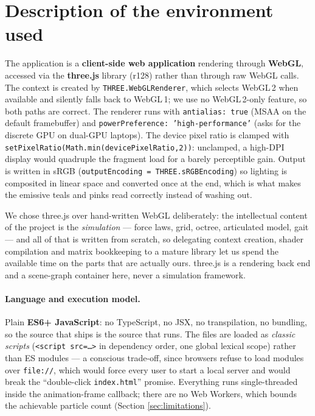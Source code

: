 \documentclass[10pt,a4paper]{article}
\newcommand{\code}[1]{\texttt{\small #1}}
\newcommand{\file}[1]{\texttt{\small\color{accent!70!black}#1}}
\begin{document}
\section{Description of the environment used}
\label{sec:environment}

The application is a \textbf{client-side web application} rendering through \textbf{WebGL}, accessed via
the \textbf{three.js} library (r128) rather than through raw WebGL calls. The context is created by
\code{THREE.WebGLRenderer}, which selects WebGL\,2 when available and silently falls back to WebGL\,1; we
use no WebGL\,2-only feature, so both paths are correct. The renderer runs with \code{antialias:\,true}
(MSAA on the default framebuffer) and \code{powerPreference:\,'high-performance'} (asks for the discrete
GPU on dual-GPU laptops). The device pixel ratio is clamped with
\code{setPixelRatio(Math.min(devicePixelRatio,2))}: unclamped, a high-DPI display would quadruple the
fragment load for a barely perceptible gain. Output is written in sRGB
(\code{outputEncoding = THREE.sRGBEncoding}) so lighting is composited in linear space and converted once
at the end, which is what makes the emissive teals and pinks read correctly instead of washing out.

We chose three.js over hand-written WebGL deliberately: the intellectual content of the project is the
\emph{simulation} --- force laws, grid, octree, articulated model, gait --- and all of that is written from
scratch, so delegating context creation, shader compilation and matrix bookkeeping to a mature library let
us spend the available time on the parts that are actually ours. three.js is a rendering back end and a
scene-graph container here, never a simulation framework.

\paragraph{Language and execution model.} Plain \textbf{ES6+ JavaScript}: no TypeScript, no JSX, no
transpilation, no bundling, so the source that ships is the source that runs. The files are loaded as
\emph{classic scripts} (\code{<script src=\ldots>} in dependency order, one global lexical scope) rather
than ES modules --- a conscious trade-off, since browsers refuse to load modules over \code{file://}, which
would force every user to start a local server and would break the ``double-click \file{index.html}''
promise. Everything runs single-threaded inside the animation-frame callback; there are no Web Workers,
which bounds the achievable particle count (Section \ref{sec:limitations}).
\end{document}
